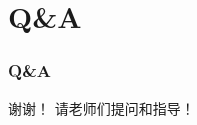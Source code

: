 \documentclass{beamer}
\begin{document}
\section{Q\&A}

\begin{frame}
  \frametitle{Q\&A}
  \begin{center}
    {\LARGE 谢谢！}
    \vspace{3em}
    {\LARGE 请老师们提问和指导！}
  \end{center}
\end{frame}
\end{document}
